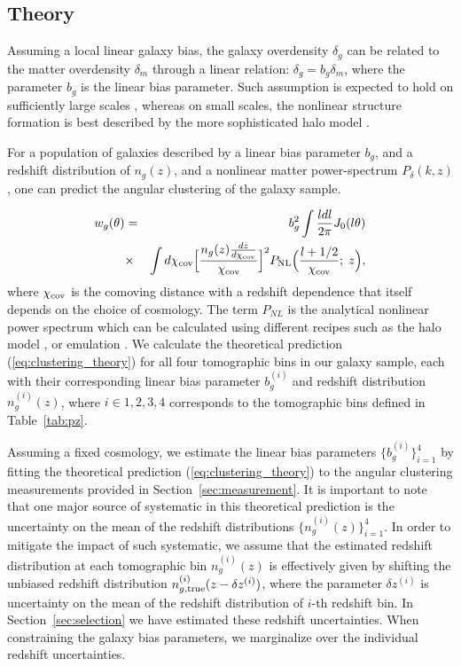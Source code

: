 \documentclass[fleqn,usenatbib,useAMS]{mnras}
\begin{document}
\subsection{Theory}

Assuming a local linear galaxy bias, the galaxy overdensity $\delta_g$ can be related to the matter overdensity $\delta_m$ through a linear relation: $\delta_g = b_g \delta_m$, where the parameter $b_g$ is the linear bias parameter. Such assumption is expected to hold on sufficiently large scales \citep[e.g.][]{dvornik2018}, whereas on small scales, the nonlinear structure formation is best described by the more sophisticated halo model \citep[e.g. ][]{hand2017,vakili_hahn}.

For a population of galaxies described by a linear bias parameter $b_g$, and a redshift distribution of $n_g(z)$, and a nonlinear matter power-spectrum $P_{\delta}(k,z)$, one can predict the angular clustering of the galaxy sample.

\begin{eqnarray}
w_{g}(\theta) &=& b_g^2 \int \frac{l dl}{2\pi}J_{0}(l\theta)  \nonumber \\ 
            &\times& \int d\chi_{\rm cov} \Big[\frac{n_{g}(z)\frac{dz}{d\chi_{\rm cov}}}{\chi_{\rm cov}}\Big]^{2}P_{\rm NL}\Big(\frac{l+1/2}{\chi_{\rm cov}}; \; z\Big),                  
\label{eq:clustering_theory}
\end{eqnarray}
where $\chi_{\rm cov}$ is the comoving distance with a redshift dependence that itself depends on the choice of cosmology. The term $P_{NL}$ is the analytical nonlinear power spectrum which can be calculated using different recipes such as the halo model \citep[e.g. ][]{takahashi2012, mead2015, smith2019}, or emulation \citep[e.g.][]{emu2014}. We calculate the theoretical prediction (\ref{eq:clustering_theory}) for all four tomographic bins in our galaxy sample, each with their corresponding linear bias parameter $b^{(i)}_{g}$ and redshift distribution $n^{(i)}_{g}(z)$, where $i\in {1,2,3,4}$ corresponds to the tomographic bins defined in Table~\ref{tab:pz}.

Assuming a fixed cosmology, we estimate the linear bias parameters $\{b^{(i)}_{g}\}_{i=1}^{4}$ by fitting the theoretical prediction (\ref{eq:clustering_theory}) to the angular clustering measurements provided in Section~\ref{sec:measurement}. It is important to note that one major source of systematic in this theoretical prediction is the uncertainty on the mean of the redshift distributions $\{n_{g}^{(i)}(z)\}_{i=1}^{4}$. In order to mitigate the impact of such systematic, we assume that the estimated redshift distribution at each tomographic bin $n_{g}^{(i)}(z)$ is effectively given by shifting the unbiased redshift distribution $n_{g, \rm true}^{(i)}(z - \delta z^{(i)})$, where the parameter $\delta z^{(i)}$ is uncertainty on the mean of the redshift distribution of $i$-th redshift bin. In Section~\ref{sec:selection} we have estimated these redshift uncertainties. When constraining the galaxy bias parameters, we marginalize over the individual redshift uncertainties. 
\end{document}
